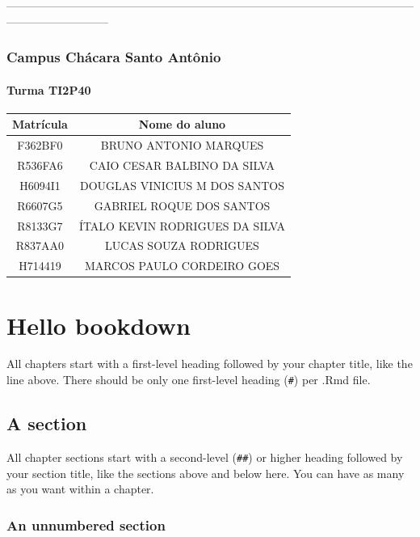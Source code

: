 \documentclass[
]{book}
\theoremstyle{definition}
\theoremstyle{definition}
\theoremstyle{definition}
\theoremstyle{definition}
\theoremstyle{remark}
\begin{document}
---------------------------------------------------------------------------------------------------------------------------------------

\subsection{Campus Chácara Santo Antônio}\label{campus-chuxe1cara-santo-antuxf4nio}

\subsubsection{Turma TI2P40}\label{turma-ti2p40}

\begin{longtable}[]{@{}cc@{}}
\toprule\noalign{}
Matrícula & Nome do aluno \\
\midrule\noalign{}
\endhead
\bottomrule\noalign{}
\endlastfoot
F362BF0 & BRUNO ANTONIO MARQUES \\
R536FA6 & CAIO CESAR BALBINO DA SILVA \\
H6094I1 & DOUGLAS VINICIUS M DOS SANTOS \\
R6607G5 & GABRIEL ROQUE DOS SANTOS \\
R8133G7 & ÍTALO KEVIN RODRIGUES DA SILVA \\
R837AA0 & LUCAS SOUZA RODRIGUES \\
H714419 & MARCOS PAULO CORDEIRO GOES \\
\end{longtable}

\chapter{Hello bookdown}\label{hello-bookdown}

All chapters start with a first-level heading followed by your chapter title, like the line above. There should be only one first-level heading (\texttt{\#}) per .Rmd file.

\section{A section}\label{a-section}

All chapter sections start with a second-level (\texttt{\#\#}) or higher heading followed by your section title, like the sections above and below here. You can have as many as you want within a chapter.

\subsection*{An unnumbered section}\label{an-unnumbered-section}
\end{document}
